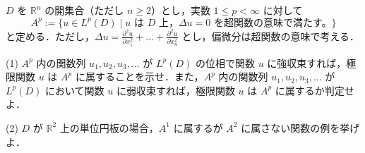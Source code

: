 \documentclass[12pt]{jlreq}
\newcommand{\R}{\mathbb{R}}
\begin{document}
\(D\) を \(\R^n\) の開集合（ただし \(n \ge 2\)）とし，実数 \(1 \le p < \infty\) に対して
\[
  A^p := \{ u \in L^p(D) \mid u \text{ は } D \text{ 上}，\Delta u = 0 \text{ を超関数の意味で満たす。} \}
\]
と定める．ただし，\(\Delta u = \frac{\partial^2 u}{\partial x_1^2} + \dots + \frac{\partial^2 u}{\partial x_n^2}\) とし，偏微分は超関数の意味で考える．

(1) \(A^p\) 内の関数列 \(u_1, u_2, u_3, \dots\) が \(L^p(D)\) の位相で関数 \(u\) に強収束すれば，極限関数 \(u\) は \(A^p\) に属することを示せ．また，\(A^p\) 内の関数列 \(u_1, u_2, u_3, \dots\) が \(L^p(D)\) において関数 \(u\) に弱収束すれば，極限関数 \(u\) は \(A^p\) に属するか判定せよ．

(2) \(D\) が \(\R^2\) 上の単位円板の場合，\(A^1\) に属するが \(A^2\) に属さない関数の例を挙げよ．
\end{document}
